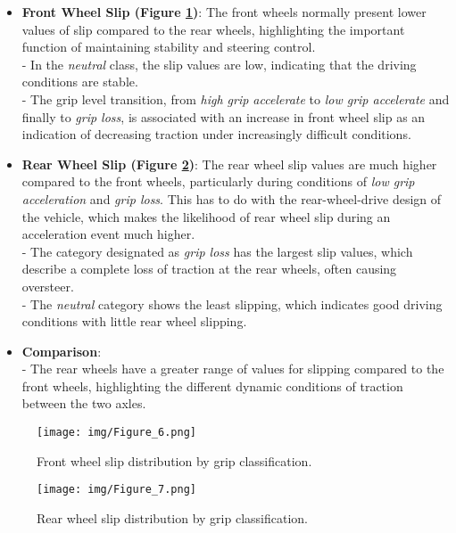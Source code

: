 \documentclass[a4paper,final,12pt]{report}
\begin{document}
\begin{itemize}
    \item \textbf{Front Wheel Slip (Figure \ref{fig:front_slip_classification})}: 
    The front wheels normally present lower values of slip compared to the rear wheels, highlighting the important function of maintaining stability and steering control.\\
    - In the \textit{neutral} class, the slip values are low, indicating that the driving conditions are stable.\\
    - The grip level transition, from \textit{high grip accelerate} to \textit{low grip accelerate} and finally to \textit{grip loss}, is associated with an increase in front wheel slip as an indication of decreasing traction under increasingly difficult conditions.

    \item \textbf{Rear Wheel Slip (Figure \ref{fig:rear_slip_classification})}: 
    The rear wheel slip values are much higher compared to the front wheels, particularly during conditions of \textit{low grip acceleration} and \textit{grip loss}. This has to do with the rear-wheel-drive design of the vehicle, which makes the likelihood of rear wheel slip during an acceleration event much higher.\\
    - The category designated as \textit{grip loss} has the largest slip values, which describe a complete loss of traction at the rear wheels, often causing oversteer.\\
    - The \textit{neutral} category shows the least slipping, which indicates good driving conditions with little rear wheel slipping.

    \item \textbf{Comparison}: \\
    - The rear wheels have a greater range of values for slipping compared to the front wheels, highlighting the different dynamic conditions of traction between the two axles.\\
\end{itemize}

\begin{figure}[H]
    \centering
    \texttt{[image: img/Figure\_6.png]}
    \caption{Front wheel slip distribution by grip classification.}
    \label{fig:front_slip_classification}
\end{figure}

\begin{figure}[H]
    \centering
    \texttt{[image: img/Figure\_7.png]}
    \caption{Rear wheel slip distribution by grip classification.}
    \label{fig:rear_slip_classification}
\end{figure}
\end{document}

